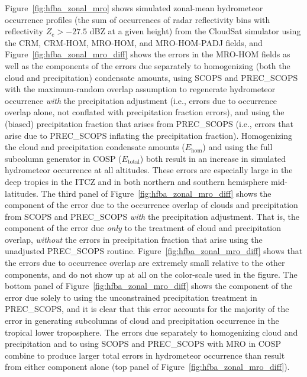 Figure~\ref{fig:hfba_zonal_mro} shows simulated zonal-mean hydrometeor
occurrence profiles (the sum of occurrences of radar reflectivity bins
with reflectivity \(Z_e > -27.5\) dBZ at a given height) from the
CloudSat simulator using the CRM, CRM-HOM, MRO-HOM, and MRO-HOM-PADJ
fields, and Figure~\ref{fig:hfba_zonal_mro_diff} shows the errors in the
MRO-HOM fields as well as the components of the errors due separately to
homogenizing (both the cloud and precipitation) condensate amounts,
using SCOPS and PREC\_SCOPS with the maximum-random overlap assumption
to regenerate hydrometeor occurrence \emph{with} the precipitation
adjustment (i.e., errors due to occurrence overlap alone, not conflated
with precipitation fraction errors), and using the (biased)
precipitation fraction that arises from PREC\_SCOPS (i.e., errors that
arise due to PREC\_SCOPS inflating the precipitation fraction).
Homogenizing the cloud and precipitation condensate amounts
(\(E_\textrm{hom}\)) and using the full subcolumn generator in COSP
(\(E_\textrm{total}\)) both result in an increase in simulated
hydrometeor occurrence at all altitudes. These errors are especially
large in the deep tropics in the ITCZ and in both northern and southern
hemisphere mid-latitudes. The third panel of
Figure~\ref{fig:hfba_zonal_mro_diff} shows the component of the error
due to the occurrence overlap of clouds and precipitation from SCOPS and
PREC\_SCOPS \emph{with} the precipitation adjustment. That is, the
component of the error due \emph{only} to the treatment of cloud and
precipitation overlap, \emph{without} the errors in precipitation
fraction that arise using the unadjusted PREC\_SCOPS routine.
Figure~\ref{fig:hfba_zonal_mro_diff} shows that the errors due to
occurrence overlap are extremely small relative to the other components,
and do not show up at all on the color-scale used in the figure. The
bottom panel of Figure~\ref{fig:hfba_zonal_mro_diff} shows the component
of the error due solely to using the unconstrained precipitation
treatment in PREC\_SCOPS, and it is clear that this error accounts for
the majority of the error in generating subcolumns of cloud and
precipitation occurrence in the tropical lower troposphere. The errors
due separately to homogenizing cloud and precipitation and to using
SCOPS and PREC\_SCOPS with MRO in COSP combine to produce larger total
errors in hydrometeor occurrence than result from either component alone
(top panel of Figure~\ref{fig:hfba_zonal_mro_diff}).

